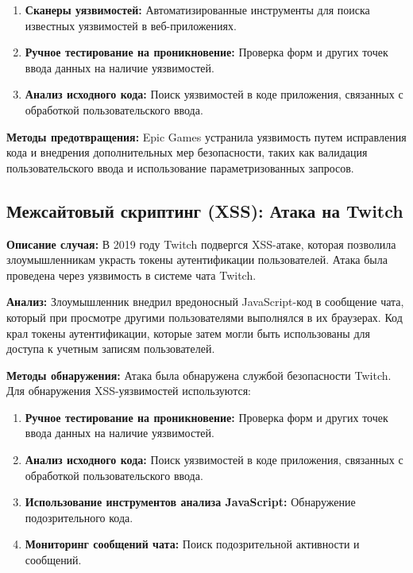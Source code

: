 \documentclass[a4paper,12pt]{diplom}
\begin{document}
	 \begin{enumerate}[label=\arabic{enumi})]
	 	\item \textbf{Сканеры уязвимостей:} Автоматизированные инструменты для поиска известных уязвимостей в веб-приложениях.
	 	\item \textbf{Ручное тестирование на проникновение:} Проверка форм и других точек ввода данных на наличие уязвимостей.
	 	\item \textbf{Анализ исходного кода:} Поиск уязвимостей в коде приложения, связанных с обработкой пользовательского ввода.
	 \end{enumerate}
	 
	 \textbf{Методы предотвращения:} Epic Games устранила уязвимость путем исправления кода и внедрения дополнительных мер безопасности, таких как валидация пользовательского ввода и использование параметризованных запросов.
	 
	 \subsection{Межсайтовый скриптинг (XSS): Атака на Twitch}
	 
	 \textbf{Описание случая:} В 2019 году Twitch подвергся XSS-атаке, которая позволила злоумышленникам украсть токены аутентификации пользователей.  Атака была проведена через уязвимость в системе чата Twitch. \cite{Twich_attack}
	 
	 \textbf{Анализ:} Злоумышленник внедрил вредоносный JavaScript-код в сообщение чата, который при просмотре другими пользователями выполнялся в их браузерах.  Код крал токены аутентификации, которые затем могли быть использованы для доступа к учетным записям пользователей. 
	 
	 \textbf{Методы обнаружения:} Атака была обнаружена службой безопасности Twitch. Для обнаружения XSS-уязвимостей используются:
	 
	 \begin{enumerate}[label=\arabic{enumi})]
	 	\item \textbf{Ручное тестирование на проникновение:} Проверка форм и других точек ввода данных на наличие уязвимостей.
	 	\item \textbf{Анализ исходного кода:} Поиск уязвимостей в коде приложения, связанных с обработкой пользовательского ввода.
	 	\item \textbf{Использование инструментов анализа JavaScript:} Обнаружение подозрительного кода.
	 	\item \textbf{Мониторинг сообщений чата:}  Поиск подозрительной активности и сообщений.
	 \end{enumerate}
	 
\end{document}
